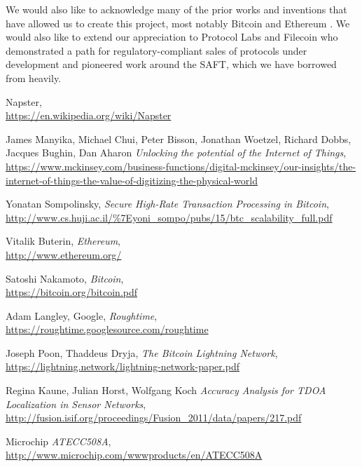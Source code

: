 \documentclass[letterpaper,11pt]{article}
\begin{document}
We would also like to acknowledge many of the prior works and inventions that have allowed us to create this project, most notably Bitcoin \cite{bitcoin} and Ethereum \cite{ethereum}. We would also like to extend our appreciation to Protocol Labs \cite{protocol} and Filecoin \cite{filecoin} who demonstrated a path for regulatory-compliant sales of protocols under development and pioneered work around the SAFT, which we have borrowed from heavily.
\newpage

\begin{thebibliography}{9}

	Napster, \\
		\url{https://en.wikipedia.org/wiki/Napster}

	James Manyika, Michael Chui, Peter Bisson, Jonathan Woetzel, Richard Dobbs, Jacques Bughin, Dan Aharon
		\textit{Unlocking the potential of the Internet of Things}, \\
		\url{https://www.mckinsey.com/business-functions/digital-mckinsey/our-insights/the-internet-of-things-the-value-of-digitizing-the-physical-world}

	Yonatan Sompolinsky,
		\textit{Secure High-Rate Transaction Processing in Bitcoin}, \\
		\url{http://www.cs.huji.ac.il/\%7Eyoni\_sompo/pubs/15/btc\_scalability\_full.pdf}

	Vitalik Buterin,
		\textit{Ethereum},\\
		\url{http://www.ethereum.org/}

	Satoshi Nakamoto,
		\textit{Bitcoin}, \\
		\url{https://bitcoin.org/bitcoin.pdf}

	Adam Langley, Google,
		\textit{Roughtime}, \\
		\url{https://roughtime.googlesource.com/roughtime}

	Joseph Poon, Thaddeus Dryja,
		\textit{The Bitcoin Lightning Network}, \\
		\url{https://lightning.network/lightning-network-paper.pdf}

	Regina Kaune, Julian Horst, Wolfgang Koch
		\textit{Accuracy Analysis for TDOA Localization in Sensor Networks}, \\
		\url{http://fusion.isif.org/proceedings/Fusion_2011/data/papers/217.pdf}	

	Microchip
		\textit{ATECC508A}, \\
		\url{http://www.microchip.com/wwwproducts/en/ATECC508A}


\end{thebibliography}
\end{document}
